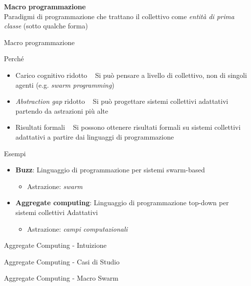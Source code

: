 \documentclass[presentation, 10pt,aspectratio=169]{beamer}\mode<presentation>{\usetheme{AMSBolognaFC}}
\begin{document}
{


\begin{frame}[c]
	
	{
	\color{customfg}

	\begin{center}
	\Large\textbf{Macro programmazione} \\
	Paradigmi di programmazione che trattano il \alert{collettivo} come \emph{entità di prima classe} (sotto qualche forma)
	\end{center}

	\vspace{1cm}	
}
\end{frame}
}
\begin{frame}{Macro programmazione}
	\begin{alertblock}{Perché}
		\begin{itemize}
			\item Carico cognitivo ridotto \faArrowRight ~ Si può pensare a livello di collettivo, non di singoli agenti (e.g. \emph{swarm programming})
			\item \emph{Abstraction gap} ridotto \faArrowRight ~ Si può progettare sistemi collettivi adattativi partendo da astrazioni più alte
			\item Risultati formali \faArrowRight ~ Si possono ottenere risultati formali su sistemi collettivi adattativi a partire dai linguaggi di programmazione
		\end{itemize}
	\end{alertblock}
	\begin{block}{Esempi}
		\begin{itemize}
			\item \textbf{Buzz}: Linguaggio di programmazione per sistemi swarm-based 
			\begin{itemize}
				\item Astrazione: \emph{swarm}
			\end{itemize}
			\item \textbf{Aggregate computing}: Linguaggio di programmazione top-down per sistemi collettivi Adattativi
			\begin{itemize}
				\item Astrazione: \emph{campi computazionali}
			\end{itemize}
		\end{itemize}
	\end{block}
\end{frame}
\begin{frame}{Aggregate Computing - Intuizione}

\end{frame}
\begin{frame}{Aggregate Computing - Casi di Studio}

\end{frame}
\begin{frame}{Aggregate Computing - Macro Swarm}

\end{frame}
\end{document}
